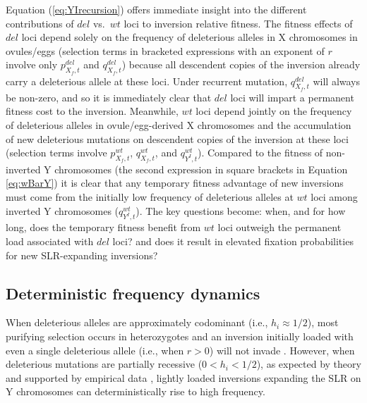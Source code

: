 \documentclass[11pt]{article}
\begin{document}
Equation (\ref{eq:YIrecursion}) offers immediate insight into the different contributions of $del$ vs.~$wt$ loci to inversion relative fitness. The fitness effects of $del$ loci depend solely on the frequency of deleterious alleles in X chromosomes in ovules/eggs (selection terms in bracketed expressions with an exponent of $r$ involve only $p_{X_f,t}^{del}$ and $q_{X_f,t}^{del}$) because all descendent copies of the inversion already carry a deleterious allele at these loci. Under recurrent mutation, $q_{X_f,t}^{del}$ will always be non-zero, and so it is immediately clear that $del$ loci will impart a permanent fitness cost to the inversion. Meanwhile, $wt$ loci depend jointly on the frequency of deleterious alleles in ovule/egg-derived X chromosomes and the accumulation of new deleterious mutations on descendent copies of the inversion at these loci (selection terms involve $p_{X_f,t}^{wt}$, $q_{X_f,t}^{wt}$, and $q_{Y^I,t}^{wt}$). Compared to the fitness of non-inverted Y chromosomes (the second expression in square brackets in Equation \ref{eq:wBarY}) it is clear that any temporary fitness advantage of new inversions must come from the initially low frequency of deleterious alleles at $wt$ loci among inverted Y chromosomes ($q_{Y^I,t}^{wt}$). The key questions become: when, and for how long, does the temporary fitness benefit from $wt$ loci outweigh the permanent load associated with $del$ loci? and does it result in elevated fixation probabilities for new SLR-expanding inversions?



\subsection*{Deterministic frequency dynamics}

When deleterious alleles are approximately codominant (i.e., $h_i \approx 1/2$), most purifying selection occurs in heterozygotes and an inversion initially loaded with even a single deleterious allele (i.e., when $r > 0$) will not invade \citep[see][]{OlitoAbbott2020,ConnallonOlito2020}. However, when deleterious mutations are partially recessive ($0 < h_i < 1/2$), as expected by theory and supported by empirical data \citep[e.g.,][]{Manna2011,AgrawalWhitlock2011}, lightly loaded inversions expanding the SLR on Y chromosomes can deterministically rise to high frequency. 
\end{document}

